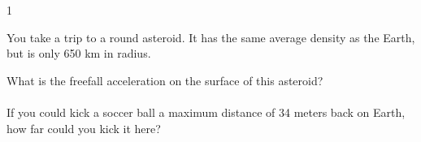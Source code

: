 
\AddToShipoutPicture*{\BackgroundPic}

\addtocounter {ProbNum} {1}

 
{\bf \Large{}} You take a trip to a round asteroid.  It has the same average density as the Earth, but is only 650 km in radius. 
 
\bigskip
What is the freefall acceleration on the surface of this asteroid?\paragraph{}
\noindent
\vfill

If you could kick a soccer ball a maximum distance of 34 meters back on Earth, how far could you kick it here?
\vfill
\newpage

